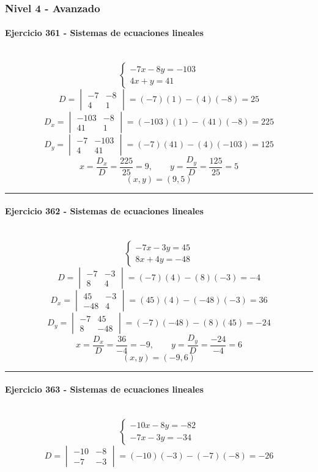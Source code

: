 \documentclass[10pt,a4paper]{article}
\newcommand{\res}[1]{\paragraph{#1}\mbox{}\\[-1.2em]}
\begin{document}
\subsubsection*{Nivel 4 - Avanzado}
\res{Ejercicio 361 - Sistemas de ecuaciones lineales}
\[ \begin{cases}- 7 x - 8 y=-103\\4 x + y=41\end{cases} \]
\[ D=\begin{vmatrix}-7&-8\\4&1\end{vmatrix}=(-7)(1)-(4)(-8)=25 \]
\[ D_x=\begin{vmatrix}-103&-8\\41&1\end{vmatrix}=(-103)(1)-(41)(-8)=225 \]
\[ D_y=\begin{vmatrix}-7&-103\\4&41\end{vmatrix}=(-7)(41)-(4)(-103)=125 \]
\[ x=\frac{D_x}{D}=\frac{225}{25}=9,\qquad y=\frac{D_y}{D}=\frac{125}{25}=5 \]
\[ \boxed{(x,y)=(9,5)} \]
\vspace{1mm}\hrule\vspace{2mm}
\res{Ejercicio 362 - Sistemas de ecuaciones lineales}
\[ \begin{cases}- 7 x - 3 y=45\\8 x + 4 y=-48\end{cases} \]
\[ D=\begin{vmatrix}-7&-3\\8&4\end{vmatrix}=(-7)(4)-(8)(-3)=-4 \]
\[ D_x=\begin{vmatrix}45&-3\\-48&4\end{vmatrix}=(45)(4)-(-48)(-3)=36 \]
\[ D_y=\begin{vmatrix}-7&45\\8&-48\end{vmatrix}=(-7)(-48)-(8)(45)=-24 \]
\[ x=\frac{D_x}{D}=\frac{36}{-4}=-9,\qquad y=\frac{D_y}{D}=\frac{-24}{-4}=6 \]
\[ \boxed{(x,y)=(-9,6)} \]
\vspace{1mm}\hrule\vspace{2mm}
\res{Ejercicio 363 - Sistemas de ecuaciones lineales}
\[ \begin{cases}- 10 x - 8 y=-82\\- 7 x - 3 y=-34\end{cases} \]
\[ D=\begin{vmatrix}-10&-8\\-7&-3\end{vmatrix}=(-10)(-3)-(-7)(-8)=-26 \]
\end{document}
